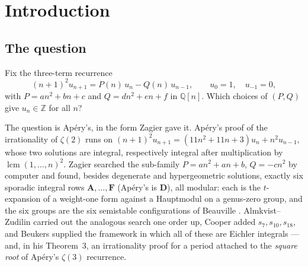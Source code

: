 \documentclass[11pt,reqno]{amsart}
\theoremstyle{plain}
\theoremstyle{definition}
\theoremstyle{remark}
\theoremstyle{plain}
\newcommand{\Z}{\mathbb{Z}}
\newcommand{\Q}{\mathbb{Q}}
\begin{document}
\maketitle

\section{Introduction}\label{sec:intro}

\subsection*{The question}
Fix the three-term recurrence
\begin{equation}\label{eq:R2gen}
(n+1)^2u_{n+1}=P(n)\,u_n-Q(n)\,u_{n-1},\qquad u_0=1,\quad u_{-1}=0,
\end{equation}
with $P=an^2+bn+c$ and $Q=dn^2+en+f$ in $\Q[n]$. Which choices of $(P,Q)$ give
$u_n\in\Z$ for all $n$?

The question is Ap\'ery's, in the form Zagier gave it. Ap\'ery's proof of the
irrationality of $\zeta(2)$ runs on
$(n+1)^2u_{n+1}=(11n^2+11n+3)u_n+n^2u_{n-1}$, whose two solutions are integral,
respectively integral after multiplication by $\operatorname{lcm}(1,\dots,n)^2$.
Zagier \cite{Zagier2009} searched the sub-family $P=an^2+an+b$, $Q=-cn^2$ by
computer and found, besides degenerate and hypergeometric solutions, exactly six
sporadic integral rows $\mathbf A,\dots,\mathbf F$ (Ap\'ery's is $\mathbf D$),
all modular: each is the $t$-expansion of a weight-one form against a Hauptmodul
on a genus-zero group, and the six groups are the six semistable configurations
of Beauville \cite{Beauville1982}. Almkvist--Zudilin
\cite{AlmkvistZudilin2006} carried out the analogous search one order up, Cooper
\cite{Cooper2012} added $s_7,s_{10},s_{18}$, and Beukers \cite{Beukers1987}
supplied the framework in which all of these are Eichler integrals --- and, in his
Theorem~3, an irrationality proof for a period attached to the \emph{square root}
of Ap\'ery's $\zeta(3)$ recurrence.
\end{document}
